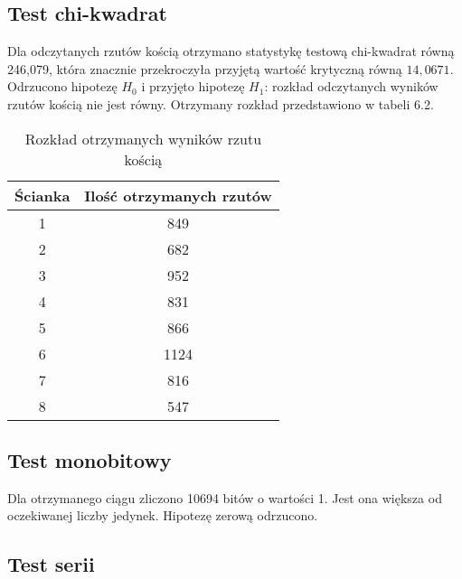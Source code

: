 \subsection{Test chi-kwadrat}
Dla odczytanych rzutów kością otrzymano statystykę testową chi-kwadrat równą 246{,}079, która znacznie przekroczyła 
przyjętą wartość krytyczną równą \begin{math} 14{,}0671 \end{math}. Odrzucono hipotezę \begin{math} H_0 \end{math} i 
przyjęto hipotezę \begin{math} H_1 \end{math}: rozkład odczytanych wyników rzutów kością nie jest równy. Otrzymany 
rozkład przedstawiono w tabeli 6.2.
\begin{table}[h]
    \centering
    \caption{Rozkład otrzymanych wyników rzutu kością}
    \begin{tabular}{|c|c|} 
        \hline
        Ścianka & Ilość otrzymanych rzutów \\
        \hline
        1 & 849 \\
        \hline
        2 & 682 \\
        \hline
        3 & 952 \\
        \hline
        4 & 831 \\
        \hline
        5 & 866 \\
        \hline
        6 & 1124 \\
        \hline  
        7 & 816 \\
        \hline 
        8 & 547 \\
        \hline 
    \end{tabular} 
\end{table}


\subsection{Test monobitowy}
Dla otrzymanego ciągu zliczono 10694 bitów o wartości 1. Jest ona większa od oczekiwanej liczby jedynek. Hipotezę zerową
odrzucono.

\subsection{Test serii}

